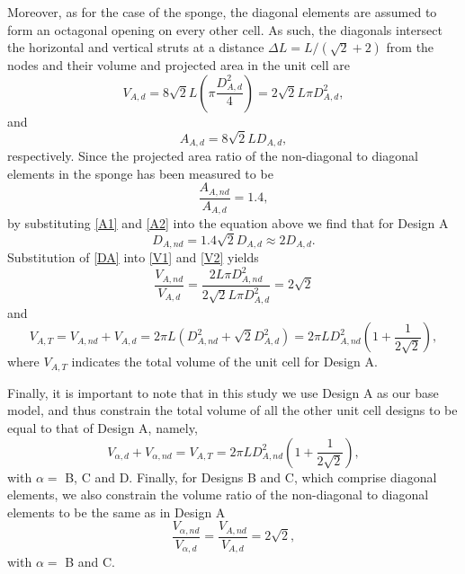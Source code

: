 \documentclass[10pt,twoside]{fernandes_supp}
\begin{document}
Moreover, as for the case of the sponge, the diagonal elements are assumed to form an octagonal opening on every other cell. As such, the diagonals intersect the horizontal and vertical struts at a distance $\Delta L=L/(\sqrt{2}+2)$ from the nodes and their  volume and projected area in the unit cell are
\begin{equation}\label{V2}
V_{A,d}=8 \sqrt{2} L\left(\pi\frac{D^2_{A,d}}{4}\right)=2\sqrt{2}L \pi D^2_{A,d},
\end{equation}
and
\begin{equation}\label{A2}
A_{A,d}=8\sqrt{2} L D_{A,d},
\end{equation}
respectively. Since the projected area ratio of the non-diagonal to diagonal elements in the sponge has been measured to be 
\begin{equation}
\frac{A_{A,nd}}{A_{A,d}}=1.4,
\end{equation}
by substituting \cref{A1} and \cref{A2} into the equation above we find that for Design A
\begin{equation} \label{DA}
D_{A,nd}=1.4\sqrt{2}D_{A,d}\approx 2 D_{A,d}.
\end{equation}
Substitution of \cref{DA} into \cref{V1} and \cref{V2} yields 
\begin{equation}
\frac{V_{A,nd}}{V_{A,d}}=\frac{2 L \pi D^2_{A,nd}}{2\sqrt{2}L \pi D^2_{A,d}}=2\sqrt{2}
\end{equation}
and
\begin{equation}\label{VT}
V_{A,T}=V_{A,nd}+V_{A,d}=2\pi L (D_{A,nd}^2+\sqrt{2} D_{A,d}^2)=2\pi L D_{A,nd}^2 \left(1+\frac{1}{2\sqrt{2}}\right),
\end{equation}
where $V_{A,T}$ indicates the total volume of the unit cell for Design A. 

Finally, it is important to note that in this study we use Design A as our base model, and thus constrain the total volume of all the other unit cell designs to be equal to that of Design A, namely,
\begin{equation}\label{con1}
V_{\alpha,d}+V_{\alpha,nd}={V}_{A,T}=2\pi L D_{A,nd}^2 \left(1+\frac{1}{2\sqrt{2}}\right),
\end{equation}
with $\alpha=$ B, C and D.
Finally,  for Designs B and C, which comprise diagonal elements, we also  constrain the volume ratio of the non-diagonal to diagonal elements to be the same as in Design A
\begin{equation}\label{con2}
\frac{V_{\alpha,nd}}{V_{\alpha,d}}=\frac{V_{A,nd}}{V_{A,d}}=2\sqrt{2},
\end{equation}
with $\alpha=$ B and C.
\end{document}
